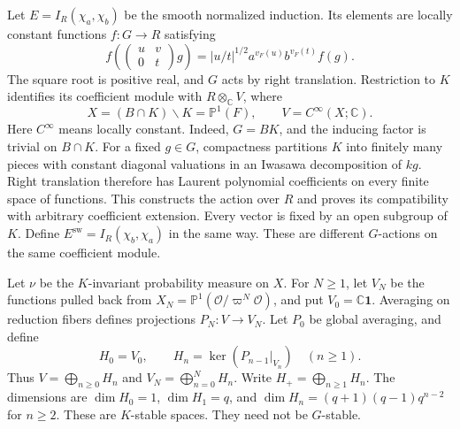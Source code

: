 Let $E=I_R(\chi_a,\chi_b)$ be the smooth normalized induction.
Its elements are locally constant functions $f:G\to R$ satisfying
\[
 f\left(\begin{pmatrix}u&v\\0&t\end{pmatrix}g\right)
   =|u/t|^{1/2}a^{v_F(u)}b^{v_F(t)}f(g).
\]
The square root is positive real, and $G$ acts by right translation.
Restriction to $K$ identifies its coefficient module with $R\otimes_\mathbb C V$, where
\[
 X=(B\cap K)\backslash K=\mathbb P^1(F),\qquad
 V=C^\infty(X;\mathbb C).
\]
Here $C^\infty$ means locally constant.
Indeed, $G=BK$, and the inducing factor is trivial on $B\cap K$.
For a fixed $g\in G$, compactness partitions $K$ into finitely many pieces
with constant diagonal valuations in an Iwasawa decomposition of $kg$.
Right translation therefore has Laurent polynomial coefficients on every finite space of functions.
This constructs the action over $R$ and proves its compatibility with arbitrary coefficient extension.
Every vector is fixed by an open subgroup of $K$.
Define $E^\mathrm{sw}=I_R(\chi_b,\chi_a)$ in the same way.
These are different $G$-actions on the same coefficient module.

Let $\nu$ be the $K$-invariant probability measure on $X$.
For $N\ge1$, let $V_N$ be the functions pulled back from
$X_N=\mathbb P^1(\mathcal O/\varpi^N\mathcal O)$, and put $V_0=\mathbb C\mathbf1$.
Averaging on reduction fibers defines projections $P_N:V\to V_N$.
Let $P_0$ be global averaging, and define
\[
 H_0=V_0,\qquad H_n=\ker(P_{n-1}|_{V_n})\quad(n\ge1).
\]
Thus $V=\bigoplus_{n\ge0}H_n$ and $V_N=\bigoplus_{n=0}^N H_n$.
Write $H_+=\bigoplus_{n\ge1}H_n$.
The dimensions are $\dim H_0=1$, $\dim H_1=q$, and
$\dim H_n=(q+1)(q-1)q^{n-2}$ for $n\ge2$.
These are $K$-stable spaces.
They need not be $G$-stable.

